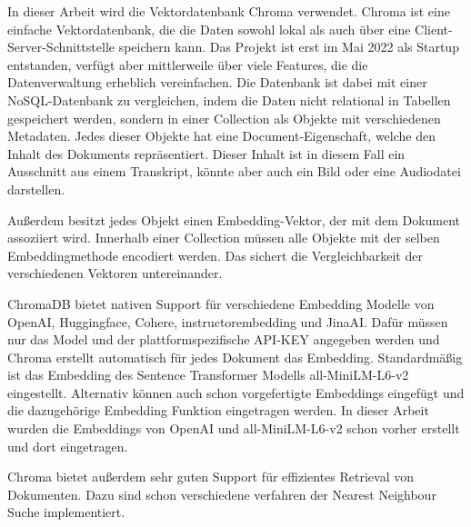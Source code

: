 





In dieser Arbeit wird die Vektordatenbank Chroma verwendet. 
Chroma ist eine einfache Vektordatenbank, die die Daten sowohl lokal als auch über eine Client-Server-Schnittstelle speichern kann.
Das Projekt ist erst im Mai 2022 als Startup entstanden, verfügt aber mittlerweile über viele Features, die die Datenverwaltung erheblich vereinfachen.
Die Datenbank ist dabei mit einer NoSQL-Datenbank zu vergleichen, indem die Daten nicht relational in Tabellen gespeichert werden, sondern in einer Collection als Objekte mit verschiedenen Metadaten.
Jedes dieser Objekte hat eine Document-Eigenschaft, welche den Inhalt des Dokuments repräsentiert.
Dieser Inhalt ist in diesem Fall ein Ausschnitt aus einem Transkript, könnte aber auch ein Bild oder eine Audiodatei darstellen.

Außerdem besitzt jedes Objekt einen Embedding-Vektor, der mit dem Dokument assoziiert wird. 
Innerhalb einer Collection müssen alle Objekte mit der selben Embeddingmethode encodiert werden.
Das sichert die Vergleichbarkeit der verschiedenen Vektoren untereinander.

ChromaDB bietet nativen Support für verschiedene Embedding Modelle von OpenAI, Huggingface, Cohere, instructorembedding und JinaAI.
Dafür müssen nur das Model und der plattformspezifische API-KEY angegeben werden und Chroma erstellt automatisch für jedes Dokument das Embedding.
Standardmäßig ist das Embedding des Sentence Transformer Modells all-MiniLM-L6-v2 eingestellt.
Alternativ können auch schon vorgefertigte Embeddings eingefügt und die dazugehörige Embedding Funktion eingetragen werden.
In dieser Arbeit wurden die Embeddings von OpenAI und all-MiniLM-L6-v2 schon vorher erstellt und dort eingetragen.

Chroma bietet außerdem sehr guten Support für effizientes Retrieval von Dokumenten.
Dazu sind schon verschiedene verfahren der Nearest Neighbour Suche implementiert.
 

